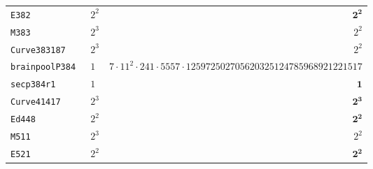 \documentclass[11pt,fleqn]{article}
\begin{document}
\begin{tabularx}{\textwidth}{llR}
\texttt{\footnotesize E382          }& $\scriptstyle 2^2$    & $\scriptstyle \mathbf{2^2}                                                                  $\\
\texttt{\footnotesize M383          }& $\scriptstyle 2^3$    & $\scriptstyle 2^2                                                                  $\\
\texttt{\footnotesize Curve383187   }& $\scriptstyle 2^3$    & $\scriptstyle 2^2                                                                  $\\
\texttt{\footnotesize brainpoolP384 }& $\scriptstyle 1  $    & $\scriptstyle 7 \cdot 11^2 \cdot 241 \cdot 5557 \cdot 125972502705620325124785968921221517         $\\
\texttt{\footnotesize secp384r1     }& $\scriptstyle 1  $    & $\scriptstyle \mathbf{1}                                                                    $\\
\texttt{\footnotesize Curve41417    }& $\scriptstyle 2^3$    & $\scriptstyle \mathbf{2^3}                                                                  $\\
\texttt{\footnotesize Ed448         }& $\scriptstyle 2^2$    & $\scriptstyle \mathbf{2^2}                                                                  $\\
\texttt{\footnotesize M511          }& $\scriptstyle 2^3$    & $\scriptstyle 2^2                                                                  $\\
\texttt{\footnotesize E521          }& $\scriptstyle 2^2$    & $\scriptstyle \mathbf{2^2}$ \\
\hline
\end{tabularx}


\printbibliography
\end{document}
